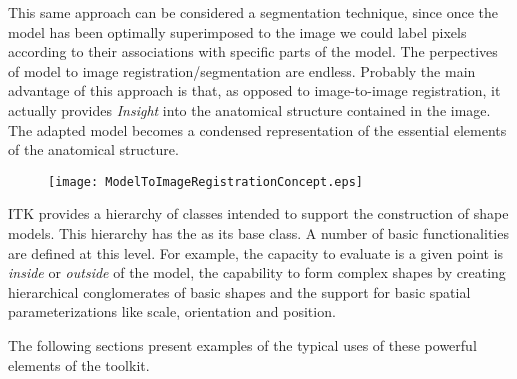 This same approach can be considered a segmentation technique, since once the
model has been optimally superimposed to the image we could label pixels
according to their associations with specific parts of the model. The
perpectives of model to image registration/segmentation are endless.  Probably
the main advantage of this approach is that, as opposed to image-to-image
registration, it actually provides \emph{Insight} into the anatomical structure
contained in the image. The adapted model becomes a condensed representation of
the essential elements of the anatomical structure.

\begin{figure}
\center
\texttt{[image: ModelToImageRegistrationConcept.eps]}
\label{fig:ModelToImageRegistrationConcept}
\end{figure}


ITK provides a hierarchy of classes intended to support the construction of
shape models. This hierarchy has the  as its base class.
A number of basic functionalities are defined at this level. For example, the
capacity to evaluate is a given point is \emph{inside} or \emph{outside} of the
model, the capability to form complex shapes by creating hierarchical
conglomerates of basic shapes and the support for basic spatial
parameterizations like scale, orientation and position.

The following sections present examples of the typical uses of these powerful
elements of the toolkit.

 





